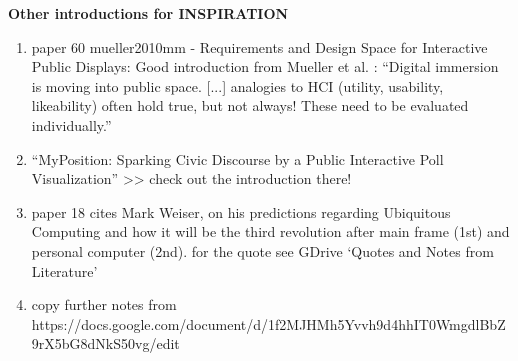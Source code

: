 	\textbf{Other introductions for INSPIRATION}

	\begin{enumerate}
		\item paper 60 mueller2010mm - Requirements and Design Space for  Interactive Public Displays: Good introduction from Mueller et al. \cite{muller2010requirements}: ``Digital immersion is moving into public space. [...] analogies to HCI (utility, usability, likeability) often hold true, but not always! These need to be evaluated individually.''

		\item ``MyPosition: Sparking Civic Discourse by a Public Interactive Poll Visualization'' >> check out the introduction there! \cite{valkanova2014myposition}

		\item paper 18 cites Mark Weiser, on his predictions regarding Ubiquitous Computing and how it will be the third revolution after main frame (1st) and personal computer (2nd). for the quote see GDrive `Quotes and Notes from Literature'

		\item copy further notes from https://docs.google.com/document/d/1f2MJHMh5Yvvh9d4hhIT0WmgdlBbZ9rX5bG8dNkS50vg/edit
	\end{enumerate}